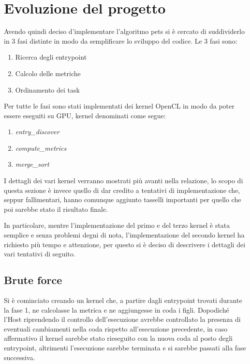 \documentclass[../relazione.tex]{subfiles}
\begin{document}
\section{Evoluzione del progetto}

Avendo quindi deciso d'implementare l'algoritmo \gls{pets}\cite{ilavarasan2007low} si è cercato di suddividerlo in 3 fasi distinte in modo da semplificare lo sviluppo del codice. 
Le 3 fasi sono:
\begin{enumerate}
    \item Ricerca degli entrypoint
    \item Calcolo delle metriche
    \item Ordinamento dei task
\end{enumerate}
Per tutte le fasi sono stati implementati dei kernel OpenCL in modo da poter essere eseguiti su GPU, kernel denominati come segue:
\begin{enumerate}
    \item \textit{entry\_discover}
    \item \textit{compute\_metrics}
    \item \textit{merge\_sort}
\end{enumerate}

I dettagli dei vari kernel verranno mostrati più avanti nella relazione, lo scopo di questa sezione è invece quello di dar credito a tentativi di implementazione che, seppur fallimentari, hanno comunque aggiunto tasselli importanti per quello che poi sarebbe stato il risultato finale.

In particolare, mentre l'implementazione del primo e del terzo kernel è stata semplice e senza problemi degni di nota, l'implementazione del secondo kernel ha richiesto più tempo e attenzione, per questo si è deciso di descrivere i dettagli dei vari tentativi di seguito.

\subsection{Brute force}

Si è cominciato creando un kernel che, a partire dagli entrypoint trovati durante la fase 1, ne calcolasse la metrica e ne aggiungesse in coda i figli.
Dopodiché l'Host riprendendo il controllo dell'esecuzione avrebbe controllato la presenza di eventuali cambiamenti nella coda rispetto all'esecuzione precedente, in caso affermativo il kernel sarebbe stato rieseguito con la nuova coda al posto degli entrypoint, altrimenti l'esecuzione sarebbe terminata e si sarebbe passati alla fase successiva.
\end{document}
